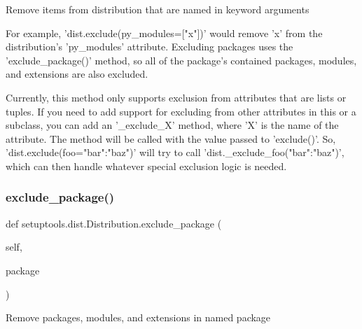 \begin{DoxyVerb}Remove items from distribution that are named in keyword arguments

For example, 'dist.exclude(py_modules=["x"])' would remove 'x' from
the distribution's 'py_modules' attribute.  Excluding packages uses
the 'exclude_package()' method, so all of the package's contained
packages, modules, and extensions are also excluded.

Currently, this method only supports exclusion from attributes that are
lists or tuples.  If you need to add support for excluding from other
attributes in this or a subclass, you can add an '_exclude_X' method,
where 'X' is the name of the attribute.  The method will be called with
the value passed to 'exclude()'.  So, 'dist.exclude(foo={"bar":"baz"})'
will try to call 'dist._exclude_foo({"bar":"baz"})', which can then
handle whatever special exclusion logic is needed.
\end{DoxyVerb}
 \mbox{\label{classsetuptools_1_1dist_1_1Distribution_afc5f2e32b85d40dbd223aa3e1bd33cf9}} 
\subsubsection{\texorpdfstring{exclude\+\_\+package()}{exclude\_package()}}
{\footnotesize\ttfamily def setuptools.\+dist.\+Distribution.\+exclude\+\_\+package (\begin{DoxyParamCaption}\item[{}]{self,  }\item[{}]{package }\end{DoxyParamCaption})}

\begin{DoxyVerb}Remove packages, modules, and extensions in named package\end{DoxyVerb}
 \mbox{\label{classsetuptools_1_1dist_1_1Distribution_a17bce0b77bfb0a4d06aa9422f1e5e0bf}} 
